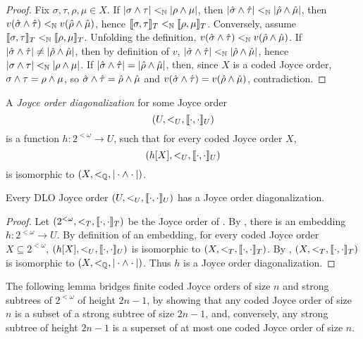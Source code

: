 \begin{proof}
Fix $\sigma, \tau, \rho, \mu \in X$. If $|\sigma \wedge \tau| <_{\mathbb{N}} |\rho \wedge \mu|$, then
$|\hat{\sigma} \wedge \hat{\tau}| <_{\mathbb{N}} |\hat{\rho} \wedge \hat{\mu}|$, then $v(\hat{\sigma} \wedge \hat{\tau}) <_{\mathbb{N}} v(\hat{\rho} \wedge \hat{\mu})$, hence $\llbracket \sigma , \tau \rrbracket_T <_{\mathbb{N}} \llbracket \rho , \mu \rrbracket_T$. Conversely, assume $\llbracket \sigma , \tau \rrbracket_T <_{\mathbb{N}} \llbracket \rho , \mu \rrbracket_T$. Unfolding the definition, $v(\hat{\sigma} \wedge \hat{\tau}) <_{\mathbb{N}} v(\hat{\rho} \wedge \hat{\mu})$. If $|\hat{\sigma} \wedge \hat{\tau}| \neq |\hat{\rho} \wedge \hat{\mu}|$, then by definition of $v$, $|\hat{\sigma} \wedge \hat{\tau}| <_{\mathbb{N}} |\hat{\rho} \wedge \hat{\mu}|$, hence $|\sigma \wedge \tau| <_{\mathbb{N}} |\rho \wedge \mu|$. If $|\hat{\sigma} \wedge \hat{\tau}| = |\hat{\rho} \wedge \hat{\mu}|$, then, since $X$ is a coded Joyce order, $\sigma \wedge \tau = \rho \wedge \mu$, so $\hat{\sigma} \wedge \hat{\tau} = \hat{\rho} \wedge \hat{\mu}$ and $v(\hat{\sigma} \wedge \hat{\tau}) = v(\hat{\rho} \wedge \hat{\mu})$, contradiction.
\end{proof}


\begin{definition}
A \emph{Joyce order diagonalization} for some Joyce order
\[\mbox{$(U,  <_U, \llbracket \cdot , \cdot \rrbracket_U)$}
\]
is a function $h: 2^{<\omega} \to U$, such that for every coded Joyce order $X$,
\[\mbox{$(h[X], <_U, \llbracket \cdot , \cdot \rrbracket_U)$}\]
is isomorphic to $(X, <_{\mathbb{Q}}, |\cdot \wedge \cdot|)$.
\end{definition}

\begin{corollary}[$\RCA_0$]\label{cor:joyce-diagonalization-exists}
Every DLO Joyce order $(U, <_U, \llbracket \cdot , \cdot \rrbracket_U)$ has a Joyce order diagonalization.
\end{corollary}
\begin{proof}
Let $(2^{<\omega}, <_T, \llbracket \cdot , \cdot \rrbracket_T)$ be the Joyce order of . By , there is an embedding $h: 2^{<\omega} \to U$. By definition of an embedding, for every coded Joyce order $X \subseteq 2^{<\omega}$, $(h[X], <_U, \llbracket \cdot , \cdot \rrbracket_U)$ is isomorphic to $(X, <_T, \llbracket \cdot , \cdot \rrbracket_T)$. By , $(X, <_T, \llbracket \cdot , \cdot \rrbracket_T)$ is isomorphic to $(X, <_{\mathbb{Q}}, |\cdot \wedge \cdot|)$. Thus $h$ is a Joyce order diagonalization.
\end{proof}

The following lemma bridges finite coded Joyce orders of size $n$
and strong subtrees of $2^{<\omega}$ of height $2n-1$, by showing that any coded Joyce order of size $n$ is a subset of a strong subtree of size $2n-1$, and, conversely, any strong subtree of height $2n-1$ is a superset of at most one coded Joyce order of size $n$.


